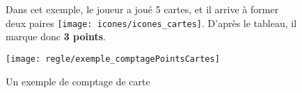 \begin{figure}[h]
\begin{tcolorbox}[colback=white,colframe=OliveGreen!75!black,title=Exemple]
{    \begin{multicols}{2}
    Dans cet exemple, le joueur \vent a joué 5 cartes, et il arrive à former deux paires \texttt{[image: icones/icones\_cartes]}. D'après le tableau, il marque donc \textbf{3 points}.
    
    \columnbreak
	\texttt{[image: regle/exemple\_comptagePointsCartes]}
    \caption{Un exemple de comptage de carte}
    \end{multicols}
}
\end{tcolorbox}
\end{figure}
\FloatBarrier